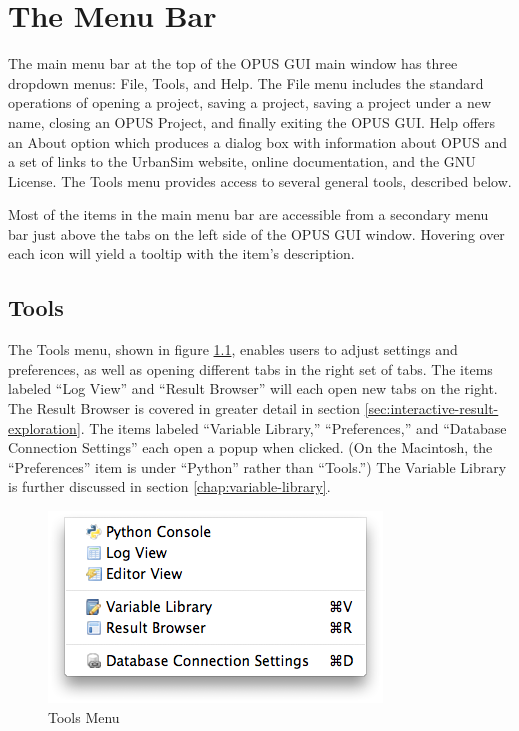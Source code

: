 \chapter{The Menu Bar}

The main menu bar at the top of the OPUS GUI main window has three dropdown
menus: File, Tools, and Help.  The File menu includes the standard
operations of opening a project, saving a project, saving a project under a
new name, closing an OPUS Project, and finally exiting the OPUS GUI\@.  Help
offers an About option which produces a dialog box with information about
OPUS and a set of links to the UrbanSim website, online documentation, and
the GNU License.  The Tools menu provides access to several general tools,
described below.

Most of the items in the main menu bar are accessible from a secondary menu
bar just above the tabs on the left side of the OPUS GUI window.  Hovering
over each icon will yield a tooltip with the item's description.

\section{Tools}

The Tools menu, shown in figure \ref{fig:menu-bar-tools}, enables users to
adjust settings and preferences, as well as opening different tabs in the
right set of tabs.  The items labeled ``Log View'' and ``Result Browser''
will each open new tabs on the right.  The Result Browser is covered in
greater detail in section \ref{sec:interactive-result-exploration}.  The
items labeled ``Variable Library,'' ``Preferences,'' and ``Database
Connection Settings'' each open a popup when clicked.  (On the Macintosh,
the ``Preferences'' item is under ``Python'' rather than ``Tools.'')  The
Variable Library is further discussed in section
\ref{chap:variable-library}.

\begin{figure}[htp]
\begin{center}
\includegraphics[scale=0.4]{part-gui/images/menu-bar-tools.png}
\end{center}
\caption{Tools Menu}
\label{fig:menu-bar-tools}
\end{figure}


